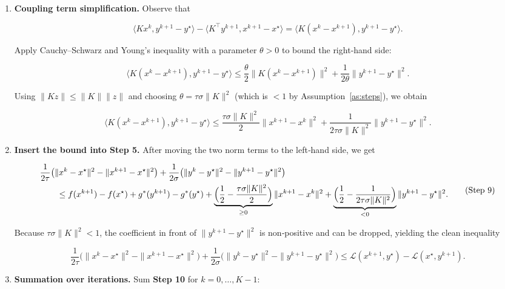 \documentclass{article}
\begin{document}
\begin{enumerate}
\item \textbf{Coupling term simplification.}  
Observe that  

\[
\langle Kx^{k},y^{k+1}-y^{\star}\rangle
-\langle K^{\!\top}y^{k+1},x^{k+1}-x^{\star}\rangle
=
\langle K(x^{k}-x^{k+1}),y^{k+1}-y^{\star}\rangle .
\tag{Step 6}
\]

Apply Cauchy–Schwarz and Young’s inequality with a parameter $\theta>0$ to bound the right‑hand side:

\[
\langle K(x^{k}-x^{k+1}),y^{k+1}-y^{\star}\rangle
\le \frac{\theta}{2}\|K(x^{k}-x^{k+1})\|^{2}
   +\frac{1}{2\theta}\|y^{k+1}-y^{\star}\|^{2}.
\tag{Step 7}
\]

Using $\|Kz\|\le\|K\|\|z\|$ and choosing $\theta=\tau\sigma\|K\|^{2}$ (which is $<1$ by Assumption~\ref{as:steps}), we obtain

\[
\langle K(x^{k}-x^{k+1}),y^{k+1}-y^{\star}\rangle
\le \frac{\tau\sigma\|K\|^{2}}{2}\|x^{k+1}-x^{k}\|^{2}
   +\frac{1}{2\tau\sigma\|K\|^{2}}\|y^{k+1}-y^{\star}\|^{2}.
\tag{Step 8}
\]

\item \textbf{Insert the bound into \textbf{Step 5}.}  
After moving the two norm terms to the left‑hand side, we get

\[
\begin{aligned}
&\frac{1}{2\tau}\bigl(\|x^{k}-x^{\star}\|^{2}
   -\|x^{k+1}-x^{\star}\|^{2}\bigr)
 +\frac{1}{2\sigma}\bigl(\|y^{k}-y^{\star}\|^{2}
   -\|y^{k+1}-y^{\star}\|^{2}\bigr)\\
&\qquad\le f(x^{k+1})-f(x^{\star})+g^{*}(y^{k+1})-g^{*}(y^{\star})
   +\underbrace{\Bigl(\frac{1}{2}-\frac{\tau\sigma\|K\|^{2}}{2}\Bigr)}_{\ge 0}
      \|x^{k+1}-x^{k}\|^{2}
   +\underbrace{\Bigl(\frac{1}{2}-\frac{1}{2\tau\sigma\|K\|^{2}}\Bigr)}_{<0}
      \|y^{k+1}-y^{\star}\|^{2}.
\end{aligned}
\tag{Step 9}
\]

Because $\tau\sigma\|K\|^{2}<1$, the coefficient in front of $\|y^{k+1}-y^{\star}\|^{2}$ is non‑positive and can be dropped, yielding the clean inequality

\[
\frac{1}{2\tau}\bigl(\|x^{k}-x^{\star}\|^{2}
   -\|x^{k+1}-x^{\star}\|^{2}\bigr)
 +\frac{1}{2\sigma}\bigl(\|y^{k}-y^{\star}\|^{2}
   -\|y^{k+1}-y^{\star}\|^{2}\bigr)
\le \mathcal L(x^{k+1},y^{\star})-\mathcal L(x^{\star},y^{k+1}).
\tag{Step 10}
\]

\item \textbf{Summation over iterations.}  
Sum \textbf{Step 10} for $k=0,\dots,K-1$:


\end{enumerate}
\end{document}
